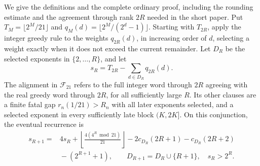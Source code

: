 \documentclass[11pt]{article}
\theoremstyle{plain}
\theoremstyle{definition}
\theoremstyle{remark}
\begin{document}
We give the definitions and the complete ordinary proof, including the
rounding estimate and the agreement through rank $2R$ needed in the
short paper. Put $T_M=\lfloor2^M/21\rfloor$ and
$q_M(d)=\lfloor2^M/(2^d-1)\rfloor$. Starting with $T_{2R}$, apply the
integer greedy rule to the weights $q_{2R}(d)$, in increasing order of
$d$, selecting a weight exactly when it does not exceed the current
remainder. Let $D_R$ be the selected exponents in $\{2,\ldots,R\}$,
and let
\[
 s_R=T_{2R}-\sum_{d\in D_R}q_{2R}(d).
\]
The alignment in $\mathcal F_{21}$ refers to the full integer word
through $2R$ agreeing with the real greedy word through $2R$, for all
sufficiently large $R$. Its other clauses are a finite fatal gap
$r_n(1/21)>R_n$ with all later exponents selected, and a selected
exponent in every sufficiently late block $(K,2K]$.
On this conjunction, the eventual recurrence is
\begin{equation}
 \begin{split}
 s_{R+1}={}&4s_R+
 \left\lfloor\frac{4(4^R\bmod21)}{21}\right\rfloor
 -2c_{D_R}(2R+1)-c_{D_R}(2R+2)\\
 &{}-(2^{R+1}+1),\qquad
 D_{R+1}=D_R\cup\{R+1\},\quad s_R>2^R.
 \end{split}
 \label{eq:record257-twenty-one-recurrence}
\end{equation}
\end{document}

